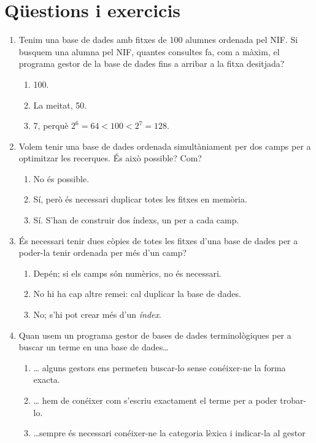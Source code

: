 \section{Qüestions i exercicis}
\begin{enumerate}

\item Tenim una base de dades amb fitxes de 100 alumnes ordenada pel
  NIF.  Si busquem una alumna pel NIF, quantes consultes fa, com a
  màxim, el programa gestor de la base de dades fins a arribar a la
  fitxa desitjada?
  \begin{enumerate}
  \item 100.
  \item La meitat, 50.
  \item 7, perquè \(2^6=64 < 100 < 2^7=128\).
  \end{enumerate}

\item Volem tenir una base de dades ordenada simultàniament per dos
  camps per a optimitzar les recerques. És això possible? Com?
  \begin{enumerate}
  \item No és possible.
  \item Sí, però és necessari duplicar totes les fitxes en memòria.
  \item Sí. S'han de construir dos índexs, un per a cada camp.
  \end{enumerate}

\item És necessari tenir dues còpies de totes les fitxes d'una base de
  dades per a poder-la tenir ordenada per més d'un camp?
  \begin{enumerate}
  \item Depén; si els camps són numèrics, no és necessari.
  \item No hi ha cap altre remei: cal duplicar la base de dades.
  \item No; s'hi pot crear més d'un \emph{índex}.
  \end{enumerate}

\item Quan usem un programa gestor de bases de dades terminològiques
  per a buscar un terme en una base de dades{\ldots}
  \begin{enumerate}
  \item {\ldots} alguns gestors ens permeten buscar-lo sense
    conéixer-ne la forma exacta.
  \item {\ldots} hem de conéixer com s'escriu exactament el terme per
    a poder trobar-lo.
  \item {\ldots}sempre és necessari conéixer-ne la categoria lèxica i
    indicar-la al gestor
  \end{enumerate}


\end{enumerate}
